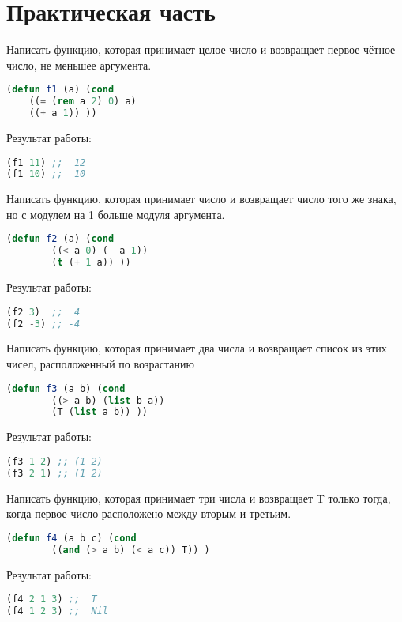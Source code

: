 \documentclass[a4paper,oneside,12pt]{extreport}
\begin{document}


\section*{Практическая часть}

\begin{task}
	Написать функцию, которая принимает целое число и возвращает первое чётное число, не меньшее аргумента.

	\begin{lstlisting}[language=Lisp]
(defun f1 (a) (cond  
	((= (rem a 2) 0) a) 
	((+ a 1)) ))
	\end{lstlisting}

	Результат работы:
	\begin{lstlisting}[language=Lisp]
(f1 11) ;;  12
(f1 10) ;;  10
	\end{lstlisting}
\end{task}


\begin{task}
	Написать функцию, которая принимает число и возвращает число того же знака, но с модулем на 1 больше модуля аргумента.

	\begin{lstlisting}[language=Lisp]
(defun f2 (a) (cond 
		((< a 0) (- a 1)) 
		(t (+ 1 a)) ))
	\end{lstlisting}

	Результат работы:
	\begin{lstlisting}[language=Lisp]
(f2 3)  ;;  4
(f2 -3) ;; -4
	\end{lstlisting}
\end{task}

\begin{task}
	Написать функцию, которая принимает два числа и возвращает список из этих чисел, расположенный по возрастанию

	\begin{lstlisting}[language=Lisp]
(defun f3 (a b) (cond 
		((> a b) (list b a))
		(T (list a b)) ))
	\end{lstlisting}

	Результат работы:
	\begin{lstlisting}[language=Lisp]
(f3 1 2) ;; (1 2)
(f3 2 1) ;; (1 2)
	\end{lstlisting}
\end{task}

\begin{task}
	Написать функцию, которая принимает три числа и возвращает T только тогда, когда первое число расположено между вторым и третьим.

	\begin{lstlisting}[language=Lisp]
(defun f4 (a b c) (cond 
		((and (> a b) (< a c)) T)) )
	\end{lstlisting}

	Результат работы:
	\begin{lstlisting}[language=Lisp]
(f4 2 1 3) ;;  T
(f4 1 2 3) ;;  Nil	
	\end{lstlisting}
\end{task}
\end{document}
